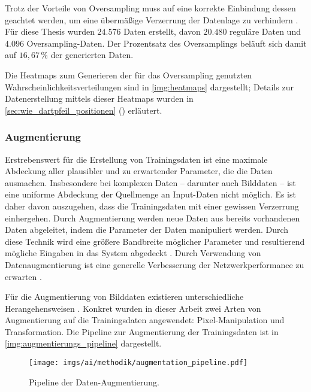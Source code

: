 Trotz der Vorteile von Oversampling muss auf eine korrekte Einbindung dessen geachtet werden, um eine übermäßige Verzerrung der Datenlage zu verhindern \cite{oversampling_bad}. Für diese Thesis wurden $24.576$ Daten erstellt, davon $20.480$ reguläre Daten und $4.096$ Oversampling-Daten. Der Prozentsatz des Oversamplings beläuft sich damit auf $16,67\,\%$ der generierten Daten.

Die Heatmaps zum Generieren der für das Oversampling genutzten Wahrscheinlichkeitsverteilungen sind in \autoref{img:heatmaps} dargestellt; Details zur Datenerstellung mittels dieser Heatmaps wurden in \autoref{sec:wie_dartpfeil_positionen} () erläutert.

\subsubsection{Augmentierung}
\label{sec:daten_augmentierung}

Erstrebenswert für die Erstellung von Trainingsdaten ist eine maximale Abdeckung aller plausibler und zu erwartender Parameter, die die Daten ausmachen. Insbesondere bei komplexen Daten -- darunter auch Bilddaten -- ist eine uniforme Abdeckung der Quellmenge an Input-Daten nicht möglich. Es ist daher davon auszugehen, dass die Trainingsdaten mit einer gewissen Verzerrung einhergehen. Durch Augmentierung werden neue Daten aus bereits vorhandenen Daten abgeleitet, indem die Parameter der Daten manipuliert werden. Durch diese Technik wird eine größere Bandbreite möglicher Parameter und resultierend mögliche Eingaben in das System abgedeckt \cite{augmentierung, augmentation_max_likelihood_est}. Durch Verwendung von Datenaugmentierung ist eine generelle Verbesserung der Netzwerkperformance zu erwarten \cite{augmentierung_auswirking}.

Für die Augmentierung von Bilddaten existieren unterschiedliche Herangehensweisen \cite{augmentierung_techniken}. Konkret wurden in dieser Arbeit zwei Arten von Augmentierung auf die Trainingsdaten angewendet: Pixel-Manipulation und Transformation. Die Pipeline zur Augmentierung der Trainingsdaten ist in \autoref{img:augmentierungs_pipeline} dargestellt.

\begin{figure}
    \centering
    \texttt{[image: imgs/ai/methodik/augmentation\_pipeline.pdf]}
    \caption{Pipeline der Daten-Augmentierung.}
    \label{img:augmentierungs_pipeline}
\end{figure}

